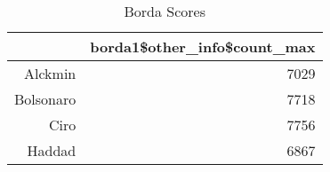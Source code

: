 \begin{table}[ht]
\centering
\begin{tabular}{rr}
  \hline
 & borda1\$other\_info\$count\_max \\ 
  \hline
Alckmin & 7029 \\ 
  Bolsonaro & 7718 \\ 
  Ciro & 7756 \\ 
  Haddad & 6867 \\ 
   \hline
\end{tabular}
\caption{Borda Scores } 
\label{tbl:subtab2}
\end{table}
